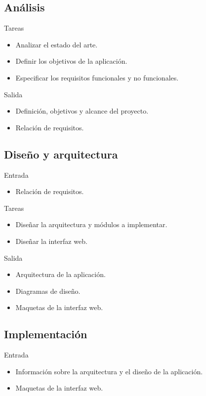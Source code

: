 \subsection*{Análisis\label{ssec:dp:analisis}}

Tareas
\begin{itemize}[leftmargin=3.5em]
  \item Analizar el estado del arte.
  \item Definir los objetivos de la aplicación.
  \item Especificar los requisitos funcionales y no funcionales.
\end{itemize}

Salida
\begin{itemize}[leftmargin=3.5em]
  \item Definición, objetivos y alcance del proyecto.
  \item Relación de requisitos.
\end{itemize}

\subsection*{Diseño y arquitectura\label{ssec:dp:disenho}}

Entrada
\begin{itemize}[leftmargin=3.5em]
  \item Relación de requisitos.
\end{itemize}

Tareas
\begin{itemize}[leftmargin=3.5em]
  \item Diseñar la arquitectura y módulos a implementar.
  \item Diseñar la interfaz web.
\end{itemize}

Salida
\begin{itemize}[leftmargin=3.5em]
  \item Arquitectura de la aplicación.
  \item Diagramas de diseño.
  \item Maquetas de la interfaz web.
\end{itemize}

\subsection*{Implementación\label{ssec:dp:implementacion}}

Entrada
\begin{itemize}[leftmargin=3.5em]
  \item Información sobre la arquitectura y el diseño de la aplicación.
  \item Maquetas de la interfaz web.
\end{itemize}

